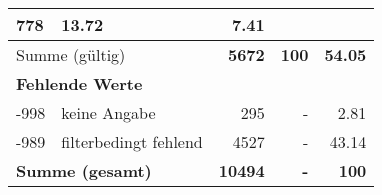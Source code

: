 \begin{longtable}{lXrrr}
       \num{778} &
       \num[round-mode=places,round-precision=2]{13,72} &
         \num[round-mode=places,round-precision=2]{7,41} \\
     \midrule
     \multicolumn{2}{l}{Summe (gültig)} &
       \textbf{\num{5672}} &
     \textbf{100} &
       \textbf{\num[round-mode=places,round-precision=2]{54,05}} \\
     \multicolumn{5}{l}{\textbf{Fehlende Werte}}\\
       -998 &
       keine Angabe &
         \num{295} &
        - &
         \num[round-mode=places,round-precision=2]{2,81} \\
       -989 &
       filterbedingt fehlend &
         \num{4527} &
        - &
         \num[round-mode=places,round-precision=2]{43,14} \\
     \midrule
     \multicolumn{2}{l}{\textbf{Summe (gesamt)}} &
          \textbf{\num{10494}} &
        \textbf{-} &
        \textbf{100} \\
     \bottomrule
     \end{longtable}
     
